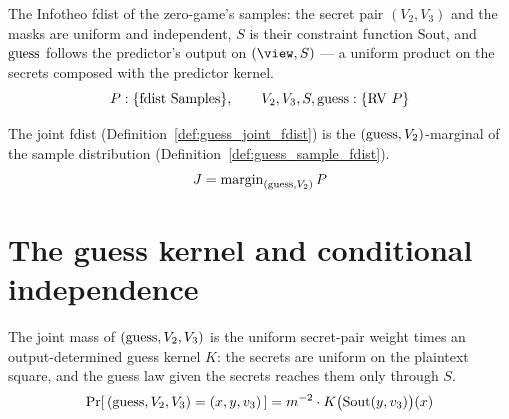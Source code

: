 \begin{definition}
  \label{def:guess_sample_fdist}
  \rocqok
  The Infotheo fdist of the zero-game's samples: the secret pair $(V_2,V_3)$ and
  the masks are uniform and independent, $S$ is their constraint function
  $\mathrm{Sout}$, and $\mathrm{guess}$ follows the predictor's output on $(\view,S)$ ---
  a uniform product on the secrets composed with the predictor kernel.
  \[ P : \{\mathrm{fdist}\ \mathrm{Samples}\},
        \qquad V_2,V_3,S,\mathrm{guess} : \{\mathrm{RV}\ P\} \]
\end{definition}

\begin{lemma}
  \label{lem:guess_joint_fdist_marginal}
  \rocqok
  The joint fdist (Definition~\ref{def:guess_joint_fdist}) is the
  $(\mathrm{guess},V_2)$-marginal of the sample distribution
  (Definition~\ref{def:guess_sample_fdist}).
  \[ J = \mathrm{margin}_{(\mathrm{guess},V_2)}\,P \]
\end{lemma}

\section{The guess kernel and conditional independence}

\begin{lemma}
  \label{lem:guess_triple_pr}
  \rocqok
  The joint mass of $(\mathrm{guess},V_2,V_3)$ is the uniform secret-pair weight times an
  output-determined guess kernel $K$: the secrets are uniform on the plaintext
  square, and the guess law given the secrets reaches them only through $S$.
  \[ \Pr[\,(\mathrm{guess},V_2,V_3)=(x,y,v_3)\,]
        = m^{-2}\cdot K\big(\mathrm{Sout}(y,v_3)\big)(x) \]
\end{lemma}

